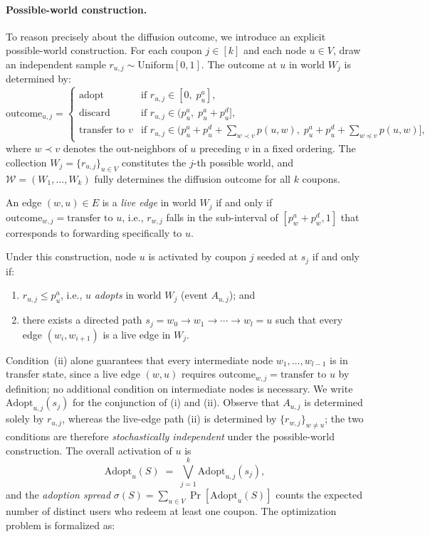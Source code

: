\documentclass[sigconf]{acmart}
\begin{document}
\paragraph{Possible-world construction.}
To reason precisely about the diffusion outcome, we introduce an explicit possible-world construction. For each coupon $j \in [k]$ and each node $u \in V$, draw an independent sample $r_{u,j} \sim \mathrm{Uniform}[0,1]$. The outcome at $u$ in world $W_j$ is determined by:
\[
  \text{outcome}_{u,j} =
  \begin{cases}
    \text{adopt}   & \text{if } r_{u,j} \in [0,\; p_u^a], \\
    \text{discard} & \text{if } r_{u,j} \in (p_u^a,\; p_u^a + p_u^d], \\
    \text{transfer to } v & \text{if } r_{u,j} \in \bigl(p_u^a + p_u^d + \textstyle\sum_{w \prec v} p(u,w),\; p_u^a + p_u^d + \textstyle\sum_{w \preceq v} p(u,w)\bigr],
  \end{cases}
\]
where $w \prec v$ denotes the out-neighbors of $u$ preceding $v$ in a fixed ordering. The collection $W_j = \{r_{u,j}\}_{u \in V}$ constitutes the $j$-th possible world, and $\mathcal{W} = (W_1, \ldots, W_k)$ fully determines the diffusion outcome for all $k$ coupons.

\begin{definition}
An edge $(w, u) \in E$ is a \emph{live edge} in world $W_j$ if and only if $\mathrm{outcome}_{w,j} = \text{transfer to } u$, i.e., $r_{w,j}$ falls in the sub-interval of $[p_w^a + p_w^d, 1]$ that corresponds to forwarding specifically to $u$.
\end{definition}

Under this construction, node $u$ is activated by coupon $j$ seeded at $s_j$ if and only if:
\begin{enumerate}[label=(\roman*)]
  \item $r_{u,j} \leq p_u^a$, i.e., $u$ \emph{adopts} in world $W_j$ (event $A_{u,j}$); and
  \item there exists a directed path $s_j = w_0 \to w_1 \to \cdots \to w_l = u$ such that every edge $(w_i, w_{i+1})$ is a live edge in $W_j$.
\end{enumerate}
Condition~(ii) alone guarantees that every intermediate node $w_1, \ldots, w_{l-1}$ is in transfer state, since a live edge $(w, u)$ requires $\mathrm{outcome}_{w,j} = \text{transfer to }u$ by definition; no additional condition on intermediate nodes is necessary. We write $\mathrm{Adopt}_{u,j}(s_j)$ for the conjunction of (i) and (ii). Observe that $A_{u,j}$ is determined solely by $r_{u,j}$, whereas the live-edge path (ii) is determined by $\{r_{w,j}\}_{w \neq u}$; the two conditions are therefore \emph{stochastically independent} under the possible-world construction. The overall activation of $u$ is
\[
  \mathrm{Adopt}_u(S) \;=\; \bigvee_{j=1}^{k} \mathrm{Adopt}_{u,j}(s_j),
\]
and the \emph{adoption spread} $\sigma(S) = \sum_{u \in V} \Pr[\mathrm{Adopt}_u(S)]$ counts the expected number of distinct users who redeem at least one coupon. The optimization problem is formalized as:
\end{document}
